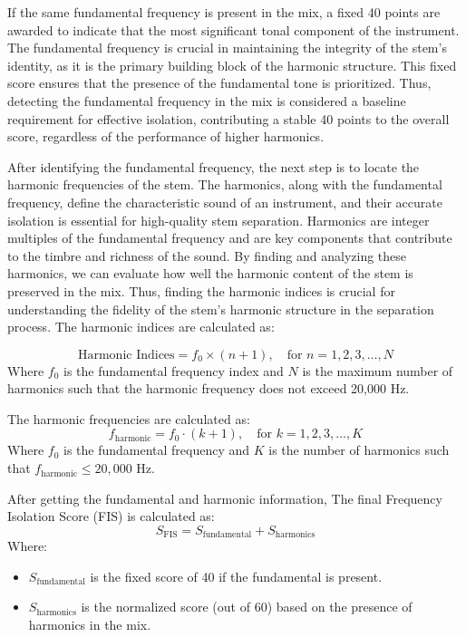 \documentclass[10pt,twocolumn]{article}
\begin{document}
If the same fundamental frequency is present in the mix, a fixed 40 points are awarded to indicate that the most significant tonal component of the instrument. The fundamental frequency is crucial in maintaining the integrity of the stem's identity, as it is the primary building block of the harmonic structure. This fixed score ensures that the presence of the fundamental tone is prioritized. Thus, detecting the fundamental frequency in the mix is considered a baseline requirement for effective isolation, contributing a stable 40 points to the overall score, regardless of the performance of higher harmonics.

After identifying the fundamental frequency, the next step is to locate the harmonic frequencies of the stem. The harmonics, along with the fundamental frequency, define the characteristic sound of an instrument, and their accurate isolation is essential for high-quality stem separation. Harmonics are integer multiples of the fundamental frequency and are key components that contribute to the timbre and richness of the sound. By finding and analyzing these harmonics, we can evaluate how well the harmonic content of the stem is preserved in the mix. Thus, finding the harmonic indices is crucial for understanding the fidelity of the stem's harmonic structure in the separation process. The harmonic indices are calculated as:

\[
\text{Harmonic Indices} = f_0 \times (n + 1), \quad \text{for } n = 1, 2, 3, \ldots, N
\]
Where \(f_0\) is the fundamental frequency index and \(N\) is the maximum number of harmonics such that the harmonic frequency does not exceed 20,000 Hz.

\vspace{0.5cm}

The harmonic frequencies are calculated as:
\[
f_{\text{harmonic}} = f_0 \cdot (k + 1), \quad \text{for } k = 1, 2, 3, \ldots, K
\]
Where \(f_0\) is the fundamental frequency and \(K\) is the number of harmonics such that \(f_{\text{harmonic}} \leq 20,000\) Hz.

\vspace{0.5cm}

After getting the fundamental and harmonic information, The final Frequency Isolation Score (FIS) is calculated as:
\[
S_{\text{FIS}} = S_{\text{fundamental}} + S_{\text{harmonics}}
\]
Where:
\begin{itemize}
  \item \(S_{\text{fundamental}}\) is the fixed score of 40 if the fundamental is present.
  \item \(S_{\text{harmonics}}\) is the normalized score (out of 60) based on the presence of harmonics in the mix.
\end{itemize}
\end{document}
